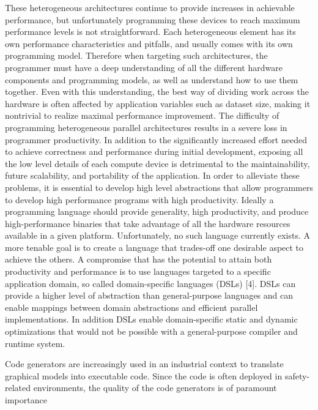 These
heterogeneous architectures continue to provide increases in
achievable performance, but unfortunately programming these
devices to reach maximum performance levels is not straightforward.
Each heterogeneous element has its own performance
characteristics and pitfalls, and usually comes with its own
programming model. Therefore when targeting such architectures,
the programmer must have a deep understanding
of all the different hardware components and programming
models, as well as understand how to use them together.
Even with this understanding, the best way of dividing work
across the hardware is often affected by application variables
such as dataset size, making it nontrivial to realize maximal
performance improvement.
The difficulty of programming heterogeneous parallel architectures
results in a severe loss in programmer productivity.
In addition to the significantly increased effort needed to
achieve correctness and performance during initial development,
exposing all the low level details of each compute
device is detrimental to the maintainability, future scalability,
and portability of the application. In order to alleviate these
problems, it is essential to develop high level abstractions that
allow programmers to develop high performance programs
with high productivity.
Ideally a programming language should provide generality,
high productivity, and produce high-performance binaries that
take advantage of all the hardware resources available in a
given platform. Unfortunately, no such language currently exists.
A more tenable goal is to create a language that trades-off
one desirable aspect to achieve the others. A compromise that
has the potential to attain both productivity and performance
is to use languages targeted to a specific application domain,
so called domain-specific languages (DSLs) [4]. DSLs can
provide a higher level of abstraction than general-purpose
languages and can enable mappings between domain abstractions
and efficient parallel implementations. In addition DSLs
enable domain-specific static and dynamic optimizations that
would not be possible with a general-purpose compiler and
runtime system.


Code generators are increasingly used in an industrial context to
translate graphical models into executable code. Since the code is
often deployed in safety-related environments, the quality of the
code generators is of paramount importance

\fi


